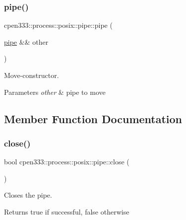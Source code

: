 \subsubsection{\texorpdfstring{pipe()}{pipe()}\hspace{0.1cm}{\footnotesize\ttfamily [2/2]}}
{\footnotesize\ttfamily cpen333\+::process\+::posix\+::pipe\+::pipe (\begin{DoxyParamCaption}\item[{\hyperlink{classcpen333_1_1process_1_1posix_1_1pipe}{pipe} \&\&}]{other }\end{DoxyParamCaption})\hspace{0.3cm}{\ttfamily [inline]}}



Move-\/constructor. 


\begin{DoxyParams}{Parameters}
{\em other} & pipe to move \\
\hline
\end{DoxyParams}


\subsection{Member Function Documentation}
\mbox{\label{classcpen333_1_1process_1_1posix_1_1pipe_af36dacdb81426f3dc76904bdcf1afc8f}} 
\subsubsection{\texorpdfstring{close()}{close()}}
{\footnotesize\ttfamily bool cpen333\+::process\+::posix\+::pipe\+::close (\begin{DoxyParamCaption}{ }\end{DoxyParamCaption})\hspace{0.3cm}{\ttfamily [inline]}}



Closes the pipe. 

\begin{DoxyReturn}{Returns}
true if successful, false otherwise 
\end{DoxyReturn}
\mbox{\label{classcpen333_1_1process_1_1posix_1_1pipe_a256fbc6e54cf558ee06c5f3b65d5dc23}} 
